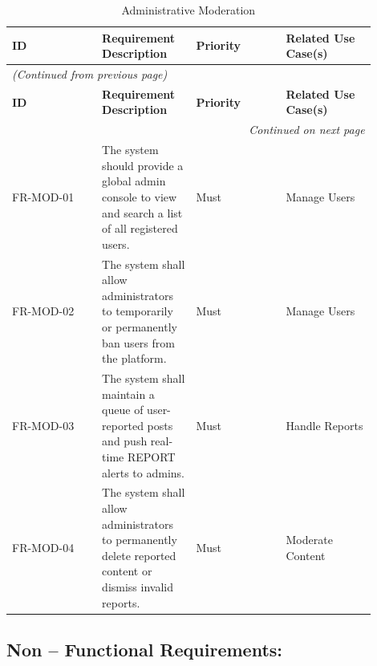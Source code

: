 \begin{longtable}{|p{0.225\linewidth}|p{0.225\linewidth}|p{0.225\linewidth}|p{0.225\linewidth}|}
\caption{Administrative Moderation} \label{tab:14} \\
\hline
\textbf{ID} & \textbf{Requirement Description} & \textbf{Priority} & \textbf{Related Use Case(s)} \\
\hline
\endfirsthead
\multicolumn{4}{l}{\textit{(Continued from previous page)}} \\
\hline
\textbf{ID} & \textbf{Requirement Description} & \textbf{Priority} & \textbf{Related Use Case(s)} \\
\hline
\endhead
\hline \multicolumn{4}{r}{\textit{Continued on next page}} \\
\endfoot
\hline
\endlastfoot
FR-MOD-01 & The system should provide a global admin console to view and search a list of all registered users. & Must & Manage Users \\
\hline
FR-MOD-02 & The system shall allow administrators to temporarily or permanently ban users from the platform. & Must & Manage Users \\
\hline
FR-MOD-03 & The system shall maintain a queue of user-reported posts and push real-time REPORT alerts to admins. & Must & Handle Reports \\
\hline
FR-MOD-04 & The system shall allow administrators to permanently delete reported content or dismiss invalid reports. & Must & Moderate Content \\
\hline
\end{longtable}


\subsection{Non -- Functional Requirements:}

